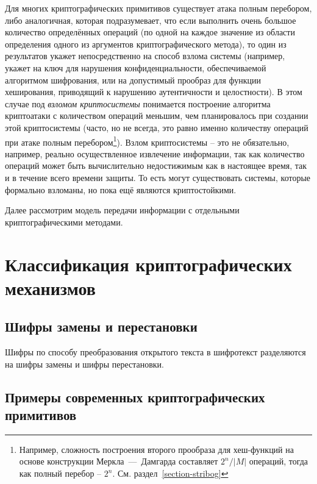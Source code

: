 Для многих криптографических примитивов существует атака полным перебором, либо аналогичная, которая подразумевает, что если выполнить очень большое количество определённых операций (по одной на каждое значение из области определения одного из аргументов криптографического метода), то один из результатов укажет непосредственно на способ взлома системы (например, укажет на ключ для нарушения конфиденциальности, обеспечиваемой алгоритмом шифрования, или на допустимый прообраз для функции хеширования, приводящий к нарушению аутентичности и целостности). В этом случае под \emph{взломом криптосистемы} понимается построение алгоритма криптоатаки с количеством операций меньшим, чем планировалось при создании этой криптосистемы (часто, но не всегда, это равно именно количеству операций при атаке полным перебором\footnote{Например, сложность построения второго прообраза для хеш-функций на основе конструкции Меркла~---~Дамгарда составляет $2^n / \left|M\right|$ операций, тогда как полный перебор -- $2^n$. См. раздел~\ref{section-stribog}}). Взлом криптосистемы – это не обязательно, например, реально осуществленное извлечение информации, так как количество операций может быть вычислительно недостижимым как в настоящее время, так и в течение всего времени защиты. То есть могут существовать системы, которые формально взломаны, но пока ещё являются криптостойкими.

Далее рассмотрим модель передачи информации с отдельными криптографическими методами.



\section{Классификация криптографических механизмов}


\subsection{Шифры замены и перестановки}

Шифры по способу преобразования открытого текста в шифротекст разделяются на шифры замены и шифры перестановки.







\subsection{Примеры современных криптографических примитивов}

